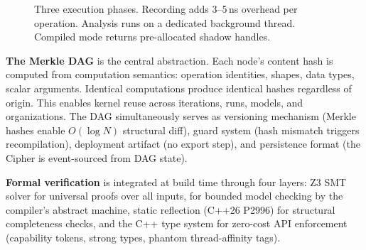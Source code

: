 \begin{figure}[ht]
\centering
{}
\caption{Three execution phases.
  Recording adds 3--5\,ns overhead per operation.
  Analysis runs on a dedicated background thread.
  Compiled mode returns pre-allocated shadow handles.}
\label{fig:phases}
\end{figure}

\textbf{The Merkle DAG} is the central abstraction.
Each node's content hash is computed from computation semantics: operation identities, shapes, data types, scalar arguments.
Identical computations produce identical hashes regardless of origin.
This enables kernel reuse across iterations, runs, models, and organizations.
The DAG simultaneously serves as versioning mechanism (Merkle hashes enable $O(\log N)$ structural diff), guard system (hash mismatch triggers recompilation), deployment artifact (no export step), and persistence format (the Cipher is event-sourced from DAG state).

\textbf{Formal verification} is integrated at build time through four layers: Z3 SMT solver for universal proofs over all inputs,  for bounded model checking by the compiler's abstract machine, static reflection (C++26 P2996) for structural completeness checks, and the C++ type system for zero-cost API enforcement (capability tokens, strong types, phantom thread-affinity tags).

